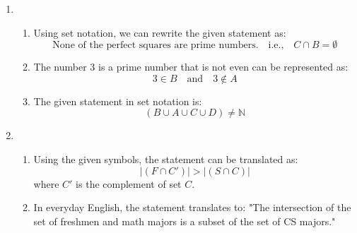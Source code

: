\documentclass{article}
\newcommand{\N}{\mathbb{N}}
\theoremstyle{definition}
\begin{document}
\begin{solution}
\begin{enumerate}
    \item 
   \begin{enumerate}
       \item Using set notation, we can rewrite the given statement as:
       \[
       \text{None of the perfect squares are prime numbers.} \quad \text{i.e.,} \quad C \cap B = \emptyset
       \]
       
       \item The number 3 is a prime number that is not even can be represented as:
       \[
       3 \in B \quad \text{and} \quad 3 \notin A
       \]
       
       \item The given statement in set notation is:
       \[
       (B \cup A \cup C \cup D) \neq \N
       \]
   \end{enumerate}
   
  \item \begin{enumerate}
       \item Using the given symbols, the statement can be translated as:
       \[
       |(F \cap C')| > |(S \cap C)|
       \]
       where $C'$ is the complement of set $C$.
       
       \item In everyday English, the statement translates to:
       "The intersection of the set of freshmen and math majors is a subset of the set of CS majors."
   \end{enumerate}
   \end{enumerate}
\end{solution}
\end{document}
